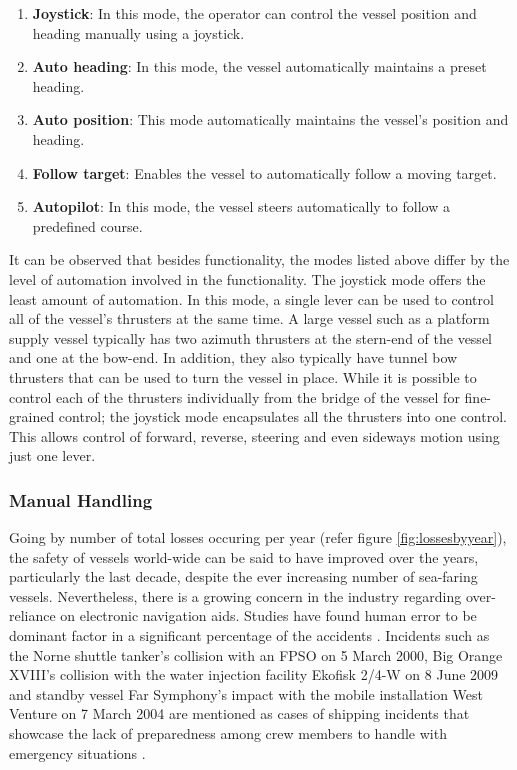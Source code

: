 \begin{enumerate}

\item \textbf{Joystick}: In this mode, the operator can control the vessel position and heading manually using a joystick. 
\item \textbf{Auto heading}: In this mode, the vessel automatically maintains a preset heading. 
\item \textbf{Auto position}: This mode automatically maintains the vessel's position and heading. 
\item \textbf{Follow target}: Enables the vessel to automatically follow a moving target. 
\item \textbf{Autopilot}: In this mode, the vessel steers automatically to follow a predefined course. 

\end{enumerate}

It can be observed that besides functionality, the modes listed above differ by the level of automation involved in the functionality. The joystick mode offers the least amount of automation. In this mode, a single lever can be used to control all of the vessel's thrusters at the same time. A large vessel such as a platform supply vessel typically has two azimuth thrusters at the stern-end of the vessel and one at the bow-end. In addition, they also typically have tunnel bow thrusters that can be used to turn the vessel in place. While it is possible to control each of the thrusters individually from the bridge of the vessel for fine-grained control; the joystick mode encapsulates all the thrusters into one control. This allows control of forward, reverse, steering and even sideways motion using just one lever. 


\subsubsection{Manual Handling}
Going by number of total losses occuring per year (refer figure \ref{fig:lossesbyyear}), the safety of vessels world-wide can be said to have improved over the years, particularly the last decade, despite the ever increasing number of sea-faring vessels. Nevertheless, there is a growing concern in the industry regarding over-reliance on electronic navigation aids. Studies have found human error to be dominant factor in a significant percentage of the accidents \parencite{baker2005accident, hauff2014analysis}. Incidents such as the Norne shuttle tanker's collision with an FPSO on 5 March 2000, Big Orange XVIII's collision with the water injection facility Ekofisk 2/4-W on 8 June 2009 and standby vessel Far Symphony's impact with the mobile installation West Venture on 7 March 2004 are mentioned as cases of shipping incidents that showcase the lack of preparedness among crew members to handle with emergency situations \parencite{vinnem2013offshore}.

